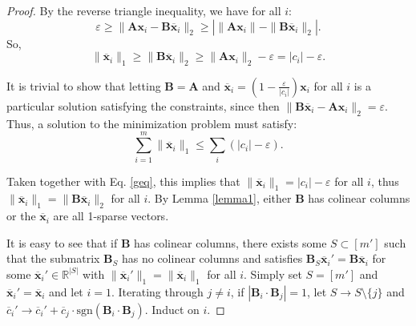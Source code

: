 \documentclass[journal, onecolumn]{IEEEtran}
\begin{document}
\begin{proof}
By the reverse triangle inequality, we have for all $i$:
\begin{equation}
\varepsilon \geq \|\mathbf{Ax}_i - \mathbf{B \overline x}_i\|_2 \geq \left| \|\mathbf{Ax}_i \| - \|\mathbf{B \overline x}_i\|_2 \right| .
\end{equation}
So,
\begin{equation}\label{geq}
\|\mathbf{\overline x}_i\|_1 \geq \|\mathbf{B \overline x}_i\|_2 \geq \|\mathbf{Ax}_i \|_2 - \varepsilon = |c_i| - \varepsilon .
\end{equation}

It is trivial to show that letting $\mathbf{B}=\mathbf{A}$ and $\mathbf{\overline x}_i = \left(1 - \frac{\varepsilon}{ |c_i| }\right) \mathbf{x}_i$ for all $i$ is a particular solution satisfying the constraints, since then $\| \mathbf{B}\mathbf{\overline x}_i - \mathbf{Ax}_i \|_2 = \varepsilon$. Thus, a solution to the minimization problem must satisfy:
\begin{equation}
\sum_{i=1}^m \|\mathbf{\overline x}_i\|_1 \leq \sum_i \left( |c_i| - \varepsilon \right).
\end{equation}

Taken together with Eq. \ref{geq}, this implies that $\|\mathbf{\overline x}_i\|_1 = |c_i| - \varepsilon$ for all $i$, thus $\|\mathbf{\overline x}_i\|_1 = \|\mathbf{B \overline x}_i\|_2$ for all $i$. By Lemma \ref{lemma1}, either $\mathbf{B}$ has colinear columns or the $\mathbf{\overline x}_i$ are all 1-sparse vectors.

It is easy to see that if $\mathbf{B}$ has colinear columns, there exists some $S \subset [m']$ such that the submatrix $\mathbf{B}_S$ has no colinear columns and satisfies $\mathbf{B}_S \mathbf{\overline x}_i' = \mathbf{B} \mathbf{\overline x}_i$ for some $\mathbf{\overline x}_i' \in \mathbb{R}^{|S|}$ with $\|\mathbf{\overline x}_i'\|_1 = \|\mathbf{\overline x}_i\|_1$ for all $i$. Simply set $S = [m']$ and $\mathbf{\overline x}_i' = \mathbf{\overline x}_i$ and let $i=1$. Iterating through $j \neq i$, if $| \mathbf{B}_i \cdot \mathbf{B}_j| = 1$, let $S \to S \setminus \{j\}$ and $\overline c_i' \to \overline c_i' + \overline c_j \cdot \text{sgn}(\mathbf{B}_i \cdot \mathbf{B}_j)$. Induct on $i$. 


\end{proof}
\end{document}
